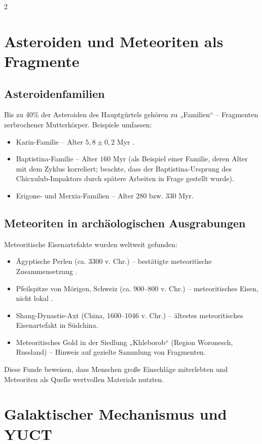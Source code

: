 \documentclass[11pt,a4paper]{article}
\begin{document}
\begin{multicols}{2}
		\section{Asteroiden und Meteoriten als Fragmente}
		
		\subsection{Asteroidenfamilien}
		
		Bis zu 40\% der Asteroiden des Hauptgürtels gehören zu „Familien“ – Fragmenten zerbrochener Mutterkörper. Beispiele umfassen:
		\begin{itemize}
			\item Karin-Familie – Alter \(5,8 \pm 0,2\) Myr \cite{Nesvorny2002}.
			\item Baptistina-Familie – Alter \(160\) Myr (als Beispiel einer Familie, deren Alter mit dem Zyklus korreliert; beachte, dass der Baptistina-Ursprung des Chicxulub-Impaktors durch spätere Arbeiten in Frage gestellt wurde).
			\item Erigone- und Merxia-Familien – Alter \(280\) bzw. \(330\) Myr.
		\end{itemize}
		
		\subsection{Meteoriten in archäologischen Ausgrabungen}
		
		Meteoritische Eisenartefakte wurden weltweit gefunden:
		\begin{itemize}
			\item Ägyptische Perlen (ca. 3300 v. Chr.) – bestätigte meteoritische Zusammensetzung \cite{Rehren2013}.
			\item Pfeilspitze von Mörigen, Schweiz (ca. 900–800 v. Chr.) – meteoritisches Eisen, nicht lokal \cite{Hofmann2023}.
			\item Shang-Dynastie-Axt (China, 1600–1046 v. Chr.) – ältestes meteoritisches Eisenartefakt in Südchina.
			\item Meteoritisches Gold in der Siedlung „Khleborob“ (Region Woronesch, Russland) – Hinweis auf gezielte Sammlung von Fragmenten.
		\end{itemize}
		Diese Funde beweisen, dass Menschen große Einschläge miterlebten und Meteoriten als Quelle wertvollen Materials nutzten.
		
		\section{Galaktischer Mechanismus und YUCT}
		

\end{multicols}
\end{document}
